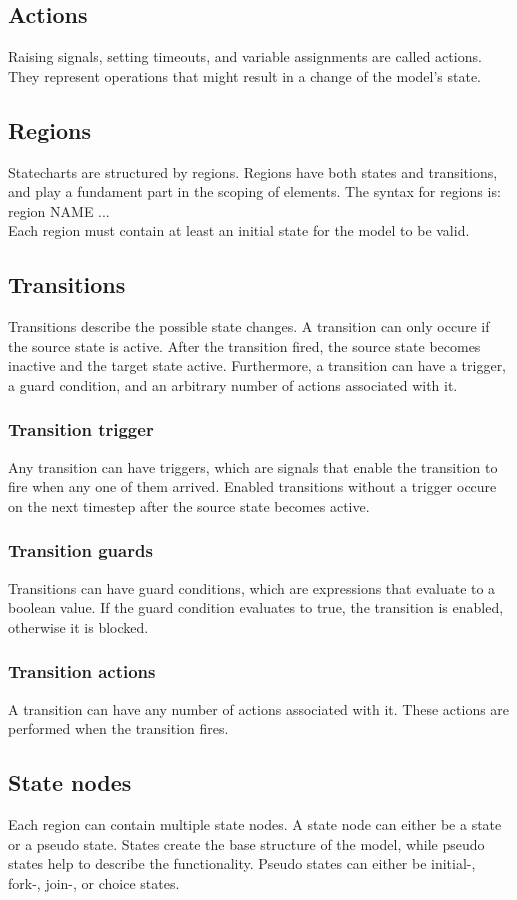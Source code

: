 {  \subsection{Actions}
Raising signals, setting timeouts, and variable assignments are called actions. They represent operations that might result in a change of the model's state.
  \subsection{Regions}
Statecharts are structured by regions. Regions have both states and transitions, and play a fundament part in the scoping of elements. The syntax for regions is: \\region NAME { ... }\\ Each region must contain at least an initial state for the model to be valid.
  \subsection{Transitions}
Transitions describe the possible state changes. A transition can only occure if the source state is active. After the transition fired, the source state becomes inactive and the target state active. Furthermore, a transition can have a trigger, a guard condition, and an arbitrary number of actions associated with it.
    \subsubsection{Transition trigger}
Any transition can have triggers, which are signals that enable the transition to fire when any one of them arrived. Enabled transitions without a trigger occure on the next timestep after the source state becomes active.
    \subsubsection{Transition guards}
Transitions can have guard conditions, which are expressions that evaluate to a boolean value. If the guard condition evaluates to true, the transition is enabled, otherwise it is blocked.
    \subsubsection{Transition actions}
A transition can have any number of actions associated with it. These actions are performed when the transition fires.
  \subsection{State nodes}
Each region can contain multiple state nodes. A state node can either be a state or a pseudo state. States create the base structure of the model, while pseudo states help to describe the functionality. Pseudo states can either be initial-, fork-, join-, or choice states.
}
